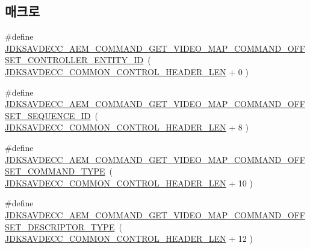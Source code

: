 \subsection*{매크로}
\begin{DoxyCompactItemize}
\item 
\#define \hyperlink{group__command__get__video__map_ga764aca87a9928164ca46b885e83fe79e}{J\+D\+K\+S\+A\+V\+D\+E\+C\+C\+\_\+\+A\+E\+M\+\_\+\+C\+O\+M\+M\+A\+N\+D\+\_\+\+G\+E\+T\+\_\+\+V\+I\+D\+E\+O\+\_\+\+M\+A\+P\+\_\+\+C\+O\+M\+M\+A\+N\+D\+\_\+\+O\+F\+F\+S\+E\+T\+\_\+\+C\+O\+N\+T\+R\+O\+L\+L\+E\+R\+\_\+\+E\+N\+T\+I\+T\+Y\+\_\+\+ID}~( \hyperlink{group__jdksavdecc__avtp__common__control__header_gaae84052886fb1bb42f3bc5f85b741dff}{J\+D\+K\+S\+A\+V\+D\+E\+C\+C\+\_\+\+C\+O\+M\+M\+O\+N\+\_\+\+C\+O\+N\+T\+R\+O\+L\+\_\+\+H\+E\+A\+D\+E\+R\+\_\+\+L\+EN} + 0 )
\item 
\#define \hyperlink{group__command__get__video__map_ga18f2f7b03a9907c054b14ed01f23519e}{J\+D\+K\+S\+A\+V\+D\+E\+C\+C\+\_\+\+A\+E\+M\+\_\+\+C\+O\+M\+M\+A\+N\+D\+\_\+\+G\+E\+T\+\_\+\+V\+I\+D\+E\+O\+\_\+\+M\+A\+P\+\_\+\+C\+O\+M\+M\+A\+N\+D\+\_\+\+O\+F\+F\+S\+E\+T\+\_\+\+S\+E\+Q\+U\+E\+N\+C\+E\+\_\+\+ID}~( \hyperlink{group__jdksavdecc__avtp__common__control__header_gaae84052886fb1bb42f3bc5f85b741dff}{J\+D\+K\+S\+A\+V\+D\+E\+C\+C\+\_\+\+C\+O\+M\+M\+O\+N\+\_\+\+C\+O\+N\+T\+R\+O\+L\+\_\+\+H\+E\+A\+D\+E\+R\+\_\+\+L\+EN} + 8 )
\item 
\#define \hyperlink{group__command__get__video__map_ga3d7d155e59452c9cdc66c34716073b7f}{J\+D\+K\+S\+A\+V\+D\+E\+C\+C\+\_\+\+A\+E\+M\+\_\+\+C\+O\+M\+M\+A\+N\+D\+\_\+\+G\+E\+T\+\_\+\+V\+I\+D\+E\+O\+\_\+\+M\+A\+P\+\_\+\+C\+O\+M\+M\+A\+N\+D\+\_\+\+O\+F\+F\+S\+E\+T\+\_\+\+C\+O\+M\+M\+A\+N\+D\+\_\+\+T\+Y\+PE}~( \hyperlink{group__jdksavdecc__avtp__common__control__header_gaae84052886fb1bb42f3bc5f85b741dff}{J\+D\+K\+S\+A\+V\+D\+E\+C\+C\+\_\+\+C\+O\+M\+M\+O\+N\+\_\+\+C\+O\+N\+T\+R\+O\+L\+\_\+\+H\+E\+A\+D\+E\+R\+\_\+\+L\+EN} + 10 )
\item 
\#define \hyperlink{group__command__get__video__map_ga6b1d15ea19ab8d2391ce33af996d6b47}{J\+D\+K\+S\+A\+V\+D\+E\+C\+C\+\_\+\+A\+E\+M\+\_\+\+C\+O\+M\+M\+A\+N\+D\+\_\+\+G\+E\+T\+\_\+\+V\+I\+D\+E\+O\+\_\+\+M\+A\+P\+\_\+\+C\+O\+M\+M\+A\+N\+D\+\_\+\+O\+F\+F\+S\+E\+T\+\_\+\+D\+E\+S\+C\+R\+I\+P\+T\+O\+R\+\_\+\+T\+Y\+PE}~( \hyperlink{group__jdksavdecc__avtp__common__control__header_gaae84052886fb1bb42f3bc5f85b741dff}{J\+D\+K\+S\+A\+V\+D\+E\+C\+C\+\_\+\+C\+O\+M\+M\+O\+N\+\_\+\+C\+O\+N\+T\+R\+O\+L\+\_\+\+H\+E\+A\+D\+E\+R\+\_\+\+L\+EN} + 12 )
\item 

\end{DoxyCompactItemize}
